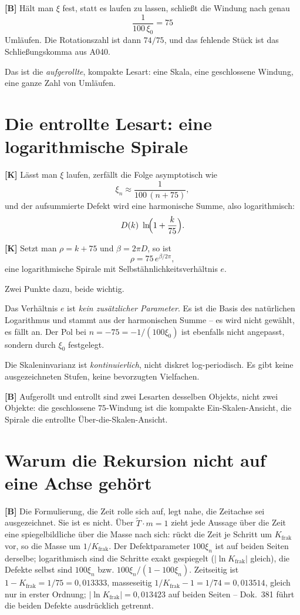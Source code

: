 \textbf{[B]} Hält man $\xi$ fest, statt es laufen zu lassen, schließt die
Windung nach genau
\[
  \frac{1}{100\,\xi_0} = 75
\]
Umläufen. Die Rotationszahl ist dann $74/75$, und das fehlende Stück ist das
Schließungskomma aus A040.

Das ist die \emph{aufgerollte}, kompakte Lesart: eine Skala, eine geschlossene
Windung, eine ganze Zahl von Umläufen.

\section{Die entrollte Lesart: eine logarithmische Spirale}

\textbf{[K]} Lässt man $\xi$ laufen, zerfällt die Folge asymptotisch wie
\[
  \xi_n \approx \frac{1}{100\,(n+75)} ,
\]
und der aufsummierte Defekt wird eine harmonische Summe, also logarithmisch:
\[
  D(k) \approx \ln\!\Bigl(1 + \frac{k}{75}\Bigr).
\]

\textbf{[K]} Setzt man $\rho = k + 75$ und $\beta = 2\pi D$, so ist
\[
  \rho = 75\,e^{\beta/2\pi} ,
\]
eine logarithmische Spirale mit Selbstähnlichkeitsverhältnis $e$.

Zwei Punkte dazu, beide wichtig.

Das Verhältnis $e$ ist \emph{kein zusätzlicher Parameter}. Es ist die Basis des
natürlichen Logarithmus und stammt aus der harmonischen Summe -- es wird nicht
gewählt, es fällt an. Der Pol bei $n = -75 = -1/(100\xi_0)$ ist ebenfalls nicht
angepasst, sondern durch $\xi_0$ festgelegt.

Die Skaleninvarianz ist \emph{kontinuierlich}, nicht diskret log-periodisch. Es
gibt keine ausgezeichneten Stufen, keine bevorzugten Vielfachen.

\textbf{[B]} Aufgerollt und entrollt sind zwei Lesarten desselben Objekts, nicht
zwei Objekte: die geschlossene $75$-Windung ist die kompakte
Ein-Skalen-Ansicht, die Spirale die entrollte Über-die-Skalen-Ansicht.

\section{Warum die Rekursion nicht auf eine Achse gehört}

\textbf{[B]} Die Formulierung, die Zeit rolle sich auf, legt nahe, die Zeitachse
sei ausgezeichnet. Sie ist es nicht. Über $\tilde T\cdot m = 1$ zieht jede
Aussage über die Zeit eine spiegelbildliche über die Masse nach sich: rückt die
Zeit je Schritt um $K_\text{frak}$ vor, so die Masse um $1/K_\text{frak}$. Der
Defektparameter $100\xi_n$ ist auf beiden Seiten derselbe; logarithmisch sind die
Schritte exakt gespiegelt ($|\ln K_\text{frak}|$ gleich), die Defekte selbst sind
$100\xi_n$ bzw. $100\xi_n/(1-100\xi_n)$.
Zeitseitig ist $1-K_\text{frak} = 1/75 = 0{,}013333$, masseseitig $1/K_\text{frak}-1 = 1/74 = 0{,}013514$,
gleich nur in erster Ordnung; $|\ln K_\text{frak}| = 0{,}013423$ auf beiden Seiten -- Dok.~381
führt die beiden Defekte ausdrücklich getrennt.

